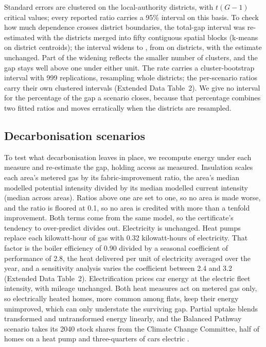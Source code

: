 \documentclass[pdflatex,sn-nature]{sn-jnl}
\begin{document}
Standard errors are clustered on the \nepiclusters{} local-authority districts, with $t(G-1)$ critical values; every reported ratio carries a 95\% interval on this basis. To check how much dependence crosses district boundaries, the total-gap interval was re-estimated with the districts merged into fifty contiguous spatial blocks (k-means on district centroids); the interval widens to \nepispatialBlockGapCI, from \nepitotalGapCI{} on districts, with the estimate unchanged. Part of the widening reflects the smaller number of clusters, and the gap stays well above one under either unit. The rate carries a cluster-bootstrap interval with 999 replications, resampling whole districts; the per-scenario ratios carry their own clustered intervals (Extended Data Table~2). We give no interval for the percentage of the gap a scenario closes, because that percentage combines two fitted ratios and moves erratically when the districts are resampled.

\subsection*{Decarbonisation scenarios}

To test what decarbonisation leaves in place, we recompute energy under each measure and re-estimate the gap, holding access as measured. Insulation scales each area's metered gas by its fabric-improvement ratio, the area's median modelled potential intensity divided by its median modelled current intensity (median \nepifabricFactorMedian{} across areas). Ratios above one are set to one, so no area is made worse, and the ratio is floored at 0.1, so no area is credited with more than a tenfold improvement. Both terms come from the same model, so the certificate's tendency to over-predict divides out. Electricity is unchanged. Heat pumps replace each kilowatt-hour of gas with 0.32 kilowatt-hours of electricity. That factor is the boiler efficiency of 0.90 divided by a seasonal coefficient of performance of 2.8, the heat delivered per unit of electricity averaged over the year, and a sensitivity analysis varies the coefficient between 2.4 and 3.2 (Extended Data Table~2). Electrification prices car energy at the electric fleet intensity, with mileage unchanged. Both heat measures act on metered gas only, so electrically heated homes, more common among flats, keep their energy unimproved, which can only understate the surviving gap. Partial uptake blends transformed and untransformed energy linearly, and the Balanced Pathway scenario takes its 2040 stock shares from the Climate Change Committee, half of homes on a heat pump and three-quarters of cars electric \citep{ccc2025}.
\end{document}

